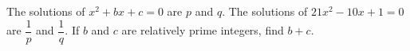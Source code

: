 The solutions of \(x^2+bx+c=0\) are \(p\) and \(q\). The solutions of \(21x^2-10x+1=0\) are \(\dfrac{1}{p}\) and \(\dfrac{1}{q}\). If \(b\) and \(c\) are relatively prime integers, find \(b+c\).
